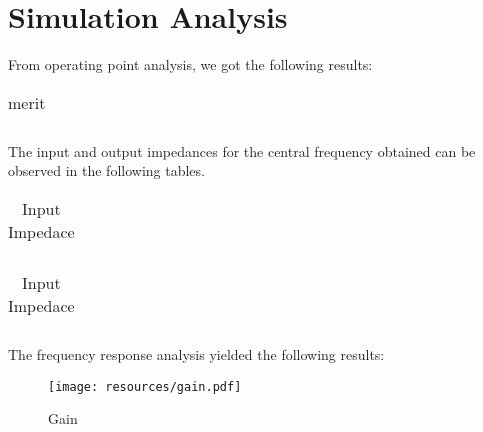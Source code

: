 \section{Simulation Analysis}
\label{sec:simulation} 

From operating point analysis, we got the following results:
\FloatBarrier
\begin{table}[h]
  \centering
  \begin{tabular}{|c|c|c|c|c|}
    \hline    
    
    \hline
  \end{tabular}
  \caption{merit}
  \label{tab:Spice1}
\end{table}
\FloatBarrier  

The input and output impedances for the central frequency obtained can be observed in the following tables.

\FloatBarrier
\begin{table}[h]
  \centering
  \begin{tabular}{|c|c|}
    \hline    
    
    \hline
  \end{tabular}
  \caption{Input Impedace}
  \label{tab:Spice1}
\end{table}
\FloatBarrier 
  
\FloatBarrier
\begin{table}[h]
  \centering
  \begin{tabular}{|c|c|}
    \hline    
    
    \hline
  \end{tabular}
  \caption{Input Impedace}
  \label{tab:Spice1}
\end{table}
\FloatBarrier  

The frequency response analysis yielded the following results:
\FloatBarrier  
\begin{figure} [!htb] 
  \texttt{[image: resources/gain.pdf]}
  \caption{Gain}
  \label{fig:theoplots}
  \hfill
\end{figure}
\FloatBarrier  



